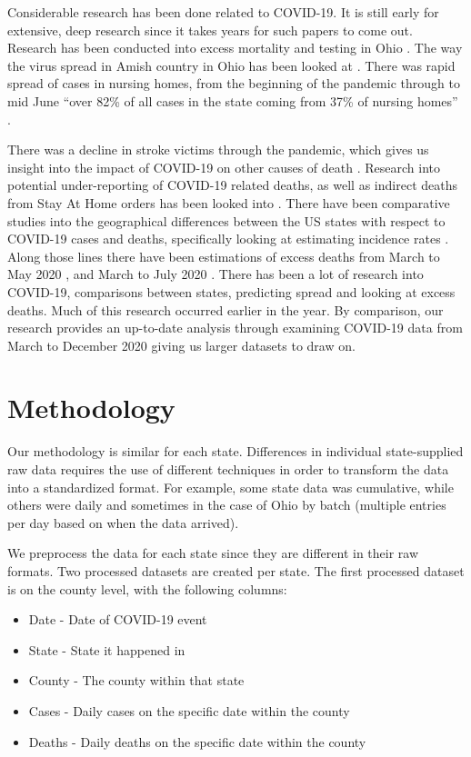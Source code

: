 \documentclass[conference]{IEEEtran}
\begin{document}
Considerable research has been done related to COVID-19. It is still early for extensive, deep research since it takes years for such papers to come out.
Research has been conducted into excess mortality and testing in Ohio \cite{quast_excess_2020}.
The way the virus spread in Amish country in Ohio has been looked at \cite{ali_covid-19_2020}.
There was rapid spread of cases in nursing homes, from the beginning of the pandemic through to mid June ``over 82\% of all cases in the state coming from 37\% of nursing homes'' \cite{bowblis_prevalence_2020}.

There was a decline in stroke victims through the pandemic, which gives us insight into the impact of COVID-19 on other causes of death \cite{uchino_decline_2020}.
Research into potential under-reporting of COVID-19 related deaths, as well as indirect deaths from Stay At Home orders has been looked into \cite{woolf_excess_2020}.
There have been comparative studies into the geographical differences between the US states with respect to COVID-19 cases and deaths, specifically looking at estimating incidence rates \cite{cdc_covid-19_response_team_geographic_2020}. 
Along those lines there have been estimations of excess deaths from March to May 2020 \cite{weinberger_estimation_2020}, and March to July 2020 \cite{woolf_excess_2020-1}.
There has been a lot of research into COVID-19, comparisons between states, predicting spread and looking at excess deaths. 
Much of this research occurred earlier in the year. By comparison, our research provides an up-to-date analysis through examining COVID-19 data from March to December 2020 giving us larger datasets to draw on.

\section{Methodology}

Our methodology is similar for each state. Differences in individual state-supplied raw data requires the use of different techniques in order to transform the data into a standardized format.
For example, some state data was cumulative, while others were daily and sometimes in the case of Ohio by batch (multiple entries per day based on when the data arrived).

We preprocess the data for each state since they are different in their raw formats.
Two processed datasets are created per state.
The first processed dataset is on the county level, with the following columns:
\begin{itemize}
  \item Date - Date of COVID-19 event
  \item State - State it happened in
  \item County - The county within that state
  \item Cases - Daily cases on the specific date within the county
  \item Deaths - Daily deaths on the specific date within the county
\end{itemize}
\end{document}
